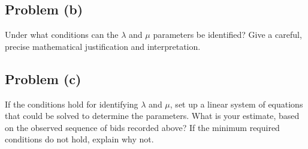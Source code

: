 \documentclass[11pt]{article}
\begin{document}
\subsection*{Problem (b)}
Under what conditions can the $\lambda$ and $\mu$ parameters be identified? Give a careful, precise mathematical justification and interpretation.

\subsection*{Problem (c)}
If the conditions hold for identifying $\lambda$ and $\mu$, set up a linear system of equations that could be solved to determine the parameters. What is your estimate, based on the observed sequence of bids recorded above? If the minimum required conditions do not hold, explain why not.
\end{document}
